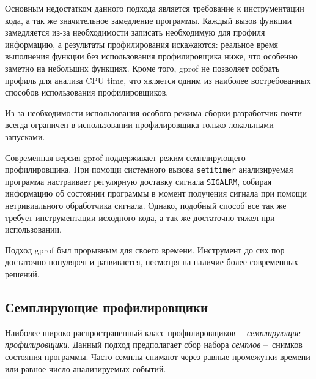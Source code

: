Основным недостатком данного подхода является требование к инструментации кода, а так же значительное замедление программы. Каждый вызов функции замедляется из-за необходимости записать необходимую для профиля информацию, а результаты профилирования искажаются: реальное время выполнения функции без использования профилировщика ниже, что особенно заметно на небольших функциях. Кроме того, gprof не позволяет собрать профиль для анализа CPU time, что является одним из наиболее востребованных способов использования профилировщиков.

Из-за необходимости использования особого режима сборки разработчик почти всегда ограничен в использовании профилировщика только локальными запусками.

Современная версия gprof поддерживает режим семплирующего профилировщика.
При помощи системного вызова \lstinline!setitimer! анализируемая программа настраивает регулярную доставку сигнала \lstinline!SIGALRM!, собирая информацию об состоянии программы в момент получения сигнала при помощи нетривиального обработчика сигнала. Однако, подобный способ все так же требует инструментации исходного кода, а так же достаточно тяжел при использовании.

Подход gprof был прорывным для своего времени.
Инструмент до сих пор достаточно популярен и развивается, несмотря на наличие более современных решений.




\subsection{Семплирующие профилировщики}
Наиболее широко распространенный класс профилировщиков – \textit{семплирующие профилировщики}.
Данный подход предполагает сбор набора \textit{семплов} – снимков состояния программы.
Часто семплы снимают через равные промежутки времени или равное число анализируемых событий.



